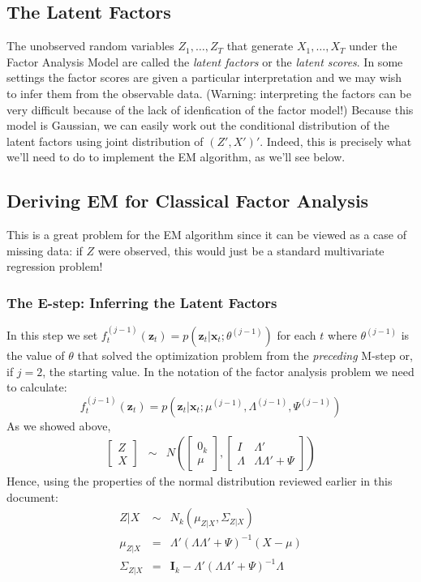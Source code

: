 \subsection{The Latent Factors}
The unobserved random variables $Z_1, \hdots, Z_T$ that generate $X_1, \hdots, X_T$ under the Factor Analysis Model are called the \emph{latent factors} or the \emph{latent scores}. In some settings the factor scores are given a particular interpretation and we may wish to infer them from the observable data. (Warning: interpreting the factors can be very difficult because of the lack of idenfication of the factor model!) Because this model is Gaussian, we can easily work out the conditional distribution of the latent factors using joint distribution of $(Z',X')'$. Indeed, this is precisely what we'll need to do to implement the EM algorithm, as we'll see below. 


\subsection{Deriving EM for Classical Factor Analysis}
This is a great problem for the EM algorithm since it can be viewed as a case of missing data: if $Z$ were observed, this would just be a standard multivariate regression problem!


\subsubsection{The E-step: Inferring the Latent Factors} In this step we set $f_t^{(j-1)}(\mathbf{z}_t) = p(\mathbf{z}_t|\mathbf{x}_t; \theta^{(j-1)})$ for each $t$ where $\theta^{(j-1)}$ is the value of $\theta$ that solved the optimization problem from the \emph{preceding} M-step or, if $j=2$, the starting value. In the notation of the factor analysis problem we need to calculate:
	$$f_t^{(j-1)}(\mathbf{z}_t) = p(\mathbf{z}_t | \mathbf{x}_t; \mu^{(j-1)}, \Lambda^{(j-1)}, \Psi^{(j-1)})$$
As we showed above,
	\begin{eqnarray*}
		\left[\begin{array}{c}
			Z\\ X
		\end{array}\right] 
		&\sim&  N\left(
		\left[\begin{array}{c}
			0_k \\ \mu
	\end{array}\right], 
		\left[\begin{array}{cc}
			I & \Lambda'\\
			\Lambda & \Lambda \Lambda' + \Psi
		\end{array} \right] \right)
	\end{eqnarray*}
Hence, using the properties of the normal distribution reviewed earlier in this document:
	\begin{eqnarray*}
		Z|X &\sim& N_k(\mu_{Z|X}, \Sigma_{Z|X})\\
		\mu_{Z|X} &=& \Lambda' (\Lambda \Lambda' + \Psi)^{-1}(X - \mu) \\
		\Sigma_{Z|X} &=& \mathbf{I}_k - \Lambda'(\Lambda \Lambda' + \Psi)^{-1}\Lambda
	\end{eqnarray*}

